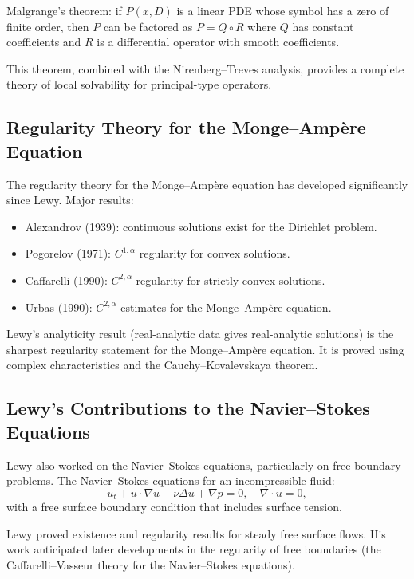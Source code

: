 Malgrange's theorem: if $P(x, D)$ is a linear PDE whose symbol has a zero of finite order, then $P$ can be factored as $P = Q \circ R$ where $Q$ has constant coefficients and $R$ is a differential operator with smooth coefficients.

This theorem, combined with the Nirenberg--Treves analysis, provides a complete theory of local solvability for principal-type operators.

\subsection{Regularity Theory for the Monge--Amp\`{e}re Equation}

The regularity theory for the Monge--Amp\`{e}re equation has developed significantly since Lewy. Major results:
\begin{itemize}
    \item Alexandrov (1939): continuous solutions exist for the Dirichlet problem.
    \item Pogorelov (1971): $C^{1,\alpha}$ regularity for convex solutions.
    \item Caffarelli (1990): $C^{2,\alpha}$ regularity for strictly convex solutions.
    \item Urbas (1990): $C^{2,\alpha}$ estimates for the Monge--Amp\`{e}re equation.
\end{itemize}

Lewy's analyticity result (real-analytic data gives real-analytic solutions) is the sharpest regularity statement for the Monge--Amp\`{e}re equation. It is proved using complex characteristics and the Cauchy--Kovalevskaya theorem.

\subsection{Lewy's Contributions to the Navier--Stokes Equations}

Lewy also worked on the Navier--Stokes equations, particularly on free boundary problems. The Navier--Stokes equations for an incompressible fluid:
\[
u_t + u \cdot \nabla u - \nu \Delta u + \nabla p = 0, \quad \nabla \cdot u = 0,
\]
with a free surface boundary condition that includes surface tension.

Lewy proved existence and regularity results for steady free surface flows. His work anticipated later developments in the regularity of free boundaries (the Caffarelli--Vasseur theory for the Navier--Stokes equations).

